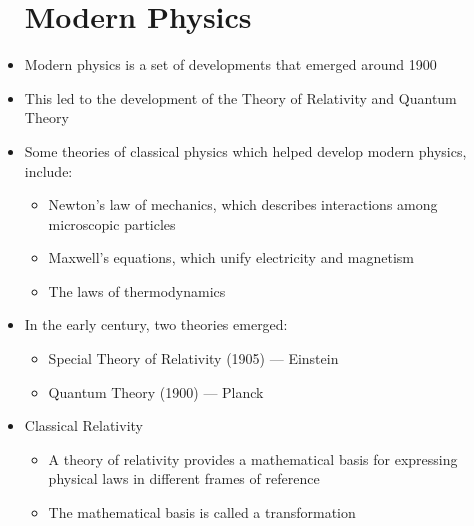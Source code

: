 \begin{itemize}

    \section{Modern Physics}

  \item Modern physics is a set of developments that emerged around 1900

  \item This led to the development of the Theory of Relativity and Quantum Theory

  \item Some theories of classical physics which helped develop modern physics, include:

    \begin{itemize}

      \item Newton's law of mechanics, which describes interactions among microscopic particles

      \item Maxwell's equations, which unify electricity and magnetism

      \item The laws of thermodynamics

    \end{itemize}

  \item In the early  century, two theories emerged:

    \begin{itemize}

      \item Special Theory of Relativity (1905) — Einstein

      \item Quantum Theory (1900) — Planck

    \end{itemize}

  \item Classical Relativity

    \begin{itemize}

      \item A theory of relativity provides a mathematical basis for expressing physical laws in different frames of reference

      \item The mathematical basis is called a transformation


\end{itemize}
\end{itemize}
